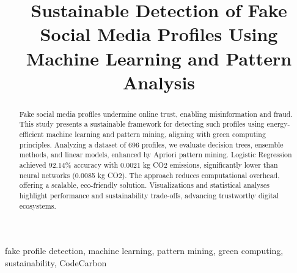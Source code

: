 \documentclass[conference]{IEEEtran}
\begin{document}
\title{Sustainable Detection of Fake Social Media Profiles Using Machine Learning and Pattern Analysis}

\author{
\and
{}
\and
{}
}

\maketitle

\begin{abstract}
Fake social media profiles undermine online trust, enabling misinformation and fraud. This study presents a sustainable framework for detecting such profiles using energy-efficient machine learning and pattern mining, aligning with green computing principles. Analyzing a dataset of 696 profiles, we evaluate decision trees, ensemble methods, and linear models, enhanced by Apriori pattern mining. Logistic Regression achieved 92.14\% accuracy with 0.0021 kg CO2 emissions, significantly lower than neural networks (0.0085 kg CO2). The approach reduces computational overhead, offering a scalable, eco-friendly solution. Visualizations and statistical analyses highlight performance and sustainability trade-offs, advancing trustworthy digital ecosystems.
\end{abstract}

\begin{IEEEkeywords}
fake profile detection, machine learning, pattern mining, green computing, sustainability, CodeCarbon
\end{IEEEkeywords}
\end{document}
